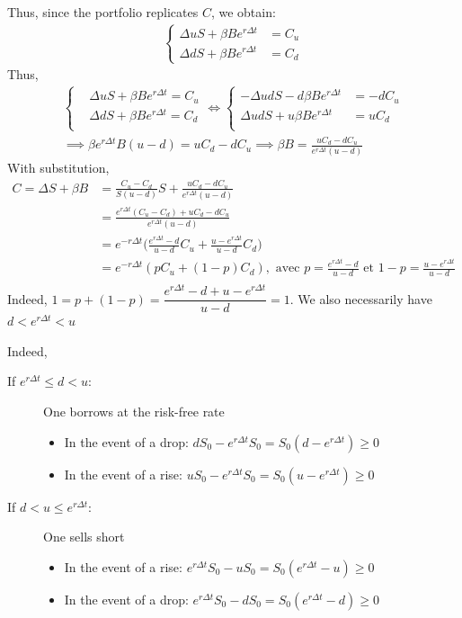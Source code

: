 Thus, since the portfolio replicates $C$, we obtain:
\begin{align*}
    \left\{
    \begin{array}{cl}
        \Delta uS + \beta Be^{r \Delta t} &= C_u \\
        \Delta dS + \beta Be^{r \Delta t} &= C_d
    \end{array}
    \right.
\end{align*}
Thus,
\begin{align*}
    \left\{ \begin{array}{cl}
    &\Delta uS + \beta Be^{r \Delta t}=C_u \\
    &\Delta dS + \beta Be^{r \Delta t}=C_d \\
    \end{array} \right. \iff  
    \left\{ \begin{array}{cl}
    -\Delta udS - d\beta Be^{r \Delta t}&=-dC_u \\
    \Delta udS + u\beta Be^{r \Delta t}&=uC_d \\
    \end{array} \right. \\
    \implies \beta e^{r \Delta t}B(u-d)=uC_d-dC_u
    \implies \beta B=\frac{uC_d-dC_u}{e^{r \Delta t}(u-d)}
\end{align*}
With substitution,
\begin{align*}
    C = \Delta S + \beta B &= \frac{C_u - C_d}{S(u-d)}S + \frac{uC_d - dC_u}{e^{r \Delta t}(u-d)} \\
    &= \frac{e^{r \Delta t}(C_u - C_d) + uC_d - dC_u}{e^{r \Delta t}(u-d)} \\ 
    &= e^{-r \Delta t}\bigg(\frac{e^{r \Delta t}-d}{u-d}C_u + \frac{u-e^{r \Delta t}}{u-d}C_d\bigg) \\
    &= e^{-r \Delta t}(pC_u + (1-p)C_d), \text{ avec } p=\frac{e^{r \Delta t}-d}{u-d} \text{ et } 1-p = \frac{u-e^{r \Delta t}}{u-d} \\
\end{align*}
\cite{IntroductionALevaluationDoptions}
\remark Indeed, $1 = p + (1 - p) = \dfrac{e^{r \Delta t}-d+u-e^{r \Delta t}}{u-d} = 1$. We also necessarily have $d<e^{r \Delta t}<u$


Indeed,
\begin{description}
    \item[If $e^{r \Delta t} \leq d < u$:] One borrows at the risk-free rate
    \begin{itemize}
    \item In the event of a drop: $dS_0-e^{r \Delta t}S_0=S_0(d-e^{r \Delta t}) \geq 0$
    \item In the event of a rise: $uS_0-e^{r \Delta t}S_0 = S_0(u-e^{r \Delta t}) \geq 0$
    \end{itemize}
    \item[If $d < u \leq e^{r \Delta t}$:] One sells short
    \begin{itemize}
    \item In the event of a rise: $e^{r \Delta t}S_0-uS_0 = S_0(e^{r \Delta t}-u) \geq 0$
    \item In the event of a drop: $e^{r \Delta t}S_0-dS_0 = S_0(e^{r \Delta t}-d) \geq 0$
\end{itemize}
\end{description}

